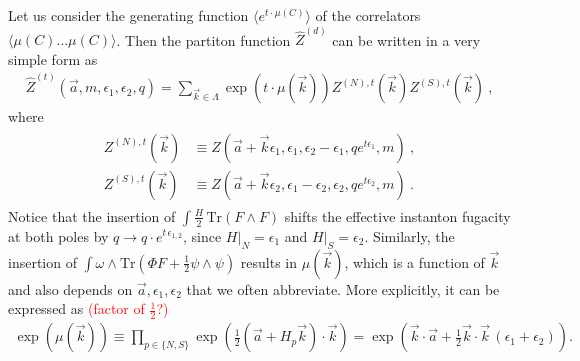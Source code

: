 \documentclass[letterpaper, 11pt]{article}
\def\e{\epsilon}
\def\half{\frac{1}{2}}
\begin{document}

Let us consider the generating function $\langle e^{t \cdot \mu(C)}\rangle $ of the correlators $\langle \mu(C) \ldots \mu(C)  \rangle$. Then the partiton function $\hat{Z}^{(d)}$ can be written in a very simple form as 
\begin{align}
 \hat{Z}^{(t)}(\vec{a}, m, \e_1, \e_2, q) = \sum_{\vec{k} \in \Lambda} \exp\left(t \cdot \mu(\vec{k}) \right)  Z^{(N), t} (\vec{k}) Z^{(S), t} (\vec{k})\ , 
\end{align} 
where
\begin{align}
\begin{split}
 Z^{(N), t}(\vec{k}) &\equiv Z(\vec{a}+\vec{k} \e_1, \e_1, \e_2-\e_1, q e^{t\e_1}, m) \ , \\
 Z^{(S), t}(\vec{k}) &\equiv Z(\vec{a}+\vec{k} \e_2, \e_1 - \e_2, \e_2, q e^{t\e_2}, m) \ . 
\end{split}
\end{align}
Notice that the insertion of  $\int \frac{H}{2}\, \text{Tr}( F \wedge F )$ shifts the effective instanton fugacity at both poles by $q \to q \cdot e^{t\, \e_{1, 2}}$, since $H|_{N} = \epsilon_1$ and $H|_{S} = \epsilon_2$. Similarly, the insertion of $\int \omega \wedge \text{Tr}(\Phi F + \half \psi \wedge \psi)$ results in $\mu(\vec{k})$, which is  a function of $\vec{k}$ and also depends on $\vec{a}, \e_1,\e_2$ that we often abbreviate. More explicitly, it can be expressed as \textcolor{red}{(factor of $\half$?)}
\begin{align}
 \exp \left( \mu(\vec{k}) \right) \equiv \prod_{p\in\{N, S\}} \exp \left( \half (\vec{a} + H_p \vec{k}) \cdot \vec{k}  \right) =  \exp \left( \vec{k} \cdot \vec{a} +  \half \vec{k}\cdot\vec{k}\, (\e_1 + \e_2) \right). 
\end{align}

\end{document}
